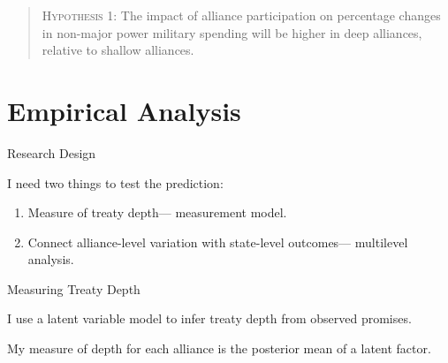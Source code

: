 \documentclass[12pt]{beamer}
\begin{document}

\begin{frame}[standout]

\begin{quote}
\textsc{Hypothesis 1}: The impact of alliance participation on percentage changes in non-major power military spending will be higher in deep alliances, relative to shallow alliances.
\end{quote} 


\end{frame}


\section{Empirical Analysis} 


\begin{frame}{Research Design}

I need two things to test the prediction: 

\pause 
\begin{enumerate} 
\item Measure of treaty depth--- measurement model. 
\pause
\item Connect alliance-level variation with state-level outcomes--- multilevel analysis.  
\end{enumerate} 


\end{frame}


\begin{frame}{Measuring Treaty Depth}

I use a latent variable model to infer treaty depth from observed promises. 

\pause 

My measure of depth for each alliance is the posterior mean of a latent factor. 

\end{frame} 

\end{document}

